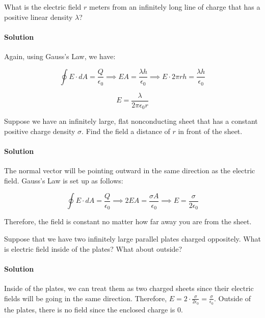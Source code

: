 \documentclass{scrartcl}
\theoremstyle{definition}
\begin{document}
	\begin{example}
		What is the electric field $r$ meters from an infinitely long line of charge that has a positive linear density $\lambda$?
	\end{example}
	
	\paragraph{Solution} Again, using Gauss's Law, we have:
	
	$$
	\oint E \cdot dA = \frac{Q}{\epsilon_0} \implies EA = \frac{\lambda h}{\epsilon_0} \implies E \cdot 2 \pi r h = \frac{\lambda h}{\epsilon_0}
	$$
	
	$$
	E = \frac{\lambda}{2 \pi \epsilon_0 r}
	$$
	
	\begin{example}
		Suppose we have an infinitely large, flat nonconducting sheet that has a constant positive charge density $\sigma$. Find the field a distance of $r$ in front of the sheet.
	\end{example}
	
	\paragraph{Solution} The normal vector will be pointing outward in the same direction as the electric field. Gauss's Law is set up as follows:
	
	$$
	\oint E \cdot dA = \frac{Q}{\epsilon_0} \implies 2EA = \frac{\sigma A}{\epsilon_0} \implies E = \frac{\sigma}{2 \epsilon_0}
	$$
	
	\noindent Therefore, the field is constant no matter how far away you are from the sheet.
	
	\begin{example}
			Suppose that we have two infinitely large parallel plates charged oppositely. What is electric field inside of the plates? What about outside?
	\end{example}
	
	\paragraph{Solution} Inside of the plates, we can treat them as two charged sheets since their electric fields will be going in the same direction. Therefore, $E = 2 \cdot \frac{\sigma}{2 \epsilon_0} = \frac{\sigma}{\epsilon_0}$. Outside of the plates, there is no field since the enclosed charge is $0$.
	
\end{document}
